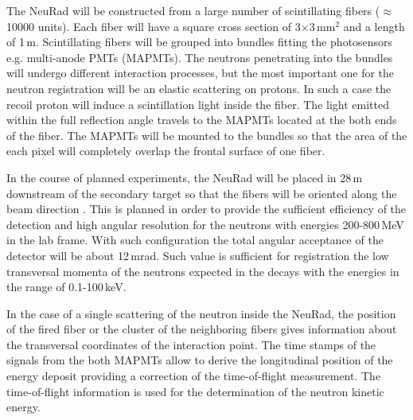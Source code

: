 \documentclass{webofc}
\begin{document}
The NeuRad will be constructed from a large number of scintillating fibers ($\approx$10000 units). Each fiber will have a square cross section of 3$\times$3\,mm$^2$ and a length of 1\,m. Scintillating fibers will be grouped into bundles fitting the photosensors e.g. multi-anode PMTs (MAPMTs).
The neutrons penetrating into the bundles will undergo different interaction processes, but the most important one for the neutron registration will be an elastic scattering on protons. In such a case the recoil proton will induce a scintillation light inside the fiber. 
The light emitted within the full reflection angle travels to the MAPMTs located at the both ends of the fiber.
The MAPMTs will be mounted to the bundles so that the area of the each pixel will completely overlap the frontal surface of one fiber.


In the course of planned experiments, the NeuRad will be placed in 28\,m downstream of the secondary target so that the fibers will be oriented along the beam direction \cite{report}.
This is planned in order to provide the sufficient efficiency of the detection and high angular resolution for the neutrons with energies 200-800\,MeV in the lab frame.
With such configuration the total angular acceptance of the detector will be about 12\,mrad.
Such value is sufficient for registration the low transversal momenta of the neutrons expected in the decays with the energies in the range of 0.1-100\,keV.

In the case of a single scattering of the neutron inside the NeuRad, the position of the fired fiber or the cluster of the neighboring fibers gives information about the transversal coordinates of the interaction point. The time stamps of the signals from the both MAPMTs allow to derive the longitudinal position of the energy deposit providing a correction of the time-of-flight measurement. The time-of-flight information is used for the determination of the neutron kinetic energy. 
\end{document}
